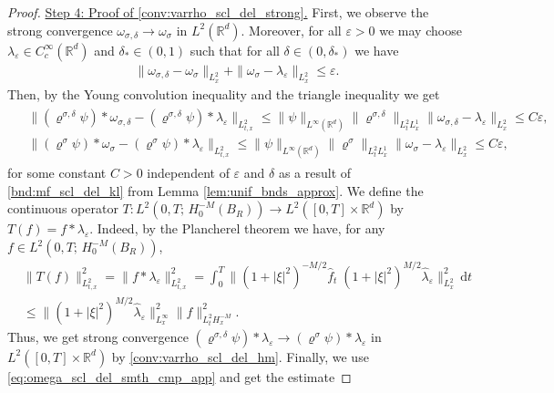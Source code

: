 \documentclass[reqno, 11pt]{amsart}
\numberwithin{equation}{section}
\theoremstyle{definition}
\begin{document}
\begin{proof}
    \underline{Step 4: Proof of \ref{conv:varrho_scl_del_strong}.}
    First, we observe the strong convergence $\omega_{\sigma,\delta}\to \omega_\sigma$ in $L^2(\mathbb{R}^{d})$. Moreover, for all $\varepsilon>0$ we may choose $\lambda_\varepsilon\in C_c^\infty(\mathbb{R}^{d})$ and $\delta_\ast\in (0,1)$ such that for all $\delta\in (0,\delta_\ast)$ we have
    \begin{align*}
        \|\omega_{\sigma,\delta}-\omega_\sigma\|_{L_x^2}+\|\omega_{\sigma}-\lambda_\varepsilon\|_{L_x^2}\leq \varepsilon.
    \end{align*}
    Then, by the Young convolution inequality and the triangle inequality we get
    \begin{align}
        \label{eq:omega_scl_del_smth_cmp_app}
        \begin{split}
            &\|(\varrho^{\sigma,\delta}\psi)\ast\omega_{\sigma,\delta}-(\varrho^{\sigma,\delta}\psi)\ast\lambda_\varepsilon\|_{L_{t,x}^2}
            \leq \|\psi\|_{L^\infty(\mathbb{R}^{d})}\|\varrho^{\sigma,\delta}\|_{L_t^2 L_x^1}\|\omega_{\sigma,\delta}-\lambda_\varepsilon\|_{L_x^2}
            \leq C\varepsilon,\\
            &\|(\varrho^\sigma\psi)\ast\omega_\sigma-(\varrho^\sigma\psi)\ast\lambda_\varepsilon\|_{L_{t,x}^2}
            \leq \|\psi\|_{L^\infty(\mathbb{R}^{d})}\|\varrho^\sigma\|_{L_t^2 L_x^1}\|\omega_\sigma-\lambda_\varepsilon\|_{L_x^2}
            \leq C\varepsilon,
        \end{split}
    \end{align}
    for some constant $C>0$ independent of $\varepsilon$ and $\delta$ as a result of \ref{bnd:mf_scl_del_kl} from Lemma \ref{lem:unif_bnds_approx}. We define the continuous operator $T\!:\!L^2(0,T;\, H_0^{-M}(B_R))\to L^2([0,T]\times \mathbb{R}^{d})$ by $T(f)=f\ast\lambda_\varepsilon$. Indeed, by the Plancherel theorem we have, for any $f\in L^2(0,T;\, H_0^{-M}(B_R))$,
    \begin{align*}
        &\| T(f)\|_{L_{t,x}^2 }^2=\|f\ast\lambda_\varepsilon\|_{L_{t,x}^2}^2
        =\int_0^T \|(1+|\xi|^2)^{-M/2}\hat{f}_t\;(1+|\xi|^2)^{M/2}\hat{\lambda}_\varepsilon\|_{L_{x}^2}^2\,\mathrm{d} t\\
        &\leq \|(1+|\xi|^2)^{M/2}\hat{\lambda}_\varepsilon\|_{L_x^\infty}^2\|f\|_{L_t^2 H_x^{-M}}^2.
    \end{align*}
    Thus, we get strong convergence $(\varrho^{\sigma,\delta}\psi)\ast\lambda_\varepsilon\to (\varrho^\sigma\psi)\ast\lambda_\varepsilon$ in $L^2([0,T]\times \mathbb{R}^{d})$ by \ref{conv:varrho_scl_del_hm}. Finally, we use \eqref{eq:omega_scl_del_smth_cmp_app} and get the estimate

\end{proof}
\end{document}
